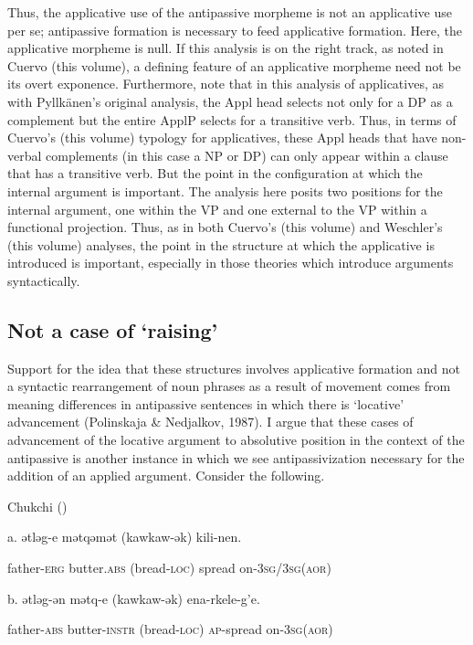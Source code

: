 \documentclass[output=paper,modfonts,nonflat]{langsci/langscibook}
\begin{document}
  Thus, the applicative use of the antipassive morpheme is not an applicative use per se; antipassive formation is necessary to feed applicative formation.  Here, the applicative morpheme is null.  If this analysis is on the right track, as noted in Cuervo (this volume),  a defining feature of an applicative morpheme need not be its overt exponence.  Furthermore, note that in this analysis of applicatives, as with Pyllkänen’s original  analysis, the Appl head selects not only for a DP as a complement but the entire ApplP selects for a transitive verb.  Thus, in terms of Cuervo’s (this volume) typology for applicatives, these Appl heads that have non-verbal complements (in this case a NP or DP) can only appear within a clause that has a transitive verb. But the point in the configuration at which the internal argument is important.  The analysis here posits two positions for the internal argument, one within the VP and one external to the VP within a functional projection.  Thus, as in both Cuervo’s (this volume) and Weschler’s (this volume) analyses, the point in the structure at which the applicative is introduced is important, especially in those theories which introduce arguments syntactically.  

\subsection{Not a case of ‘raising’} %

Support for the idea that these structures involves applicative formation and not a syntactic rearrangement of noun phrases as a result of movement comes from meaning differences in antipassive sentences in which there is ‘locative’ advancement (Polinskaja \& Nedjalkov, 1987). I argue that these cases of advancement of the locative argument to absolutive position in the context of the antipassive is another instance in which we see antipassivization necessary for the addition of an applied argument.  Consider the following.

   Chukchi (\citealt{PolinskajaNedjalkov1987})  

a.   ətləg-e  mətqəmət  (kawkaw-ək)  kili-nen.

father-\textsc{erg}  butter.\textsc{abs}  (bread-\textsc{loc})   spread on{}-3\textsc{sg}/3\textsc{sg}(\textsc{aor})

b.   ətləg-ən  mətq-e  (kawkaw-ək)  ena-rkele-g’e.

  father-\textsc{abs}  butter-\textsc{instr}  (bread-\textsc{loc})  \textsc{ap}{}-spread on-3\textsc{sg}(\textsc{aor})
\end{document}
